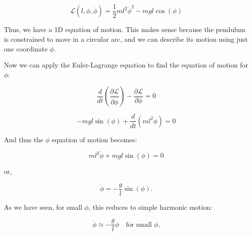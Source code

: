 \documentclass[11pt]{article}
\begin{document}
\[\mathcal{L}(l, \phi, \dot{\phi}) = \frac{1}{2} m l^2 \dot{\phi}^2 - mgl \cos(\phi)\]

Thus, we have a 1D equation of motion. This makes sense because the
pendulum is constrained to move in a circular arc, and we can describe
its motion using just one coordinate \(\phi\).

Now we can apply the Euler-Lagrange equation to find the equation of
motion for \(\phi\):

\[
\frac{d}{dt} \left( \frac{\partial \mathcal{L}}{\partial \dot{\phi}} \right) - \frac{\partial \mathcal{L}}{\partial \phi} = 0
\]

\[-mgl \sin(\phi) + \frac{d}{dt} (ml^2 \dot{\phi}) = 0\]

And thus the \(\phi\) equation of motion becomes:

\[ml^2 \ddot{\phi} + mgl \sin(\phi) = 0\]

or,

\[\ddot{\phi} = - \frac{g}{l} \sin(\phi).\]

As we have seen, for small \(\phi\), this reduces to simple harmonic
motion:

\[\ddot{\phi} \approx -\frac{g}{l} \phi \quad \text{for small } \phi.\]

    


    
    
    
\end{document}
